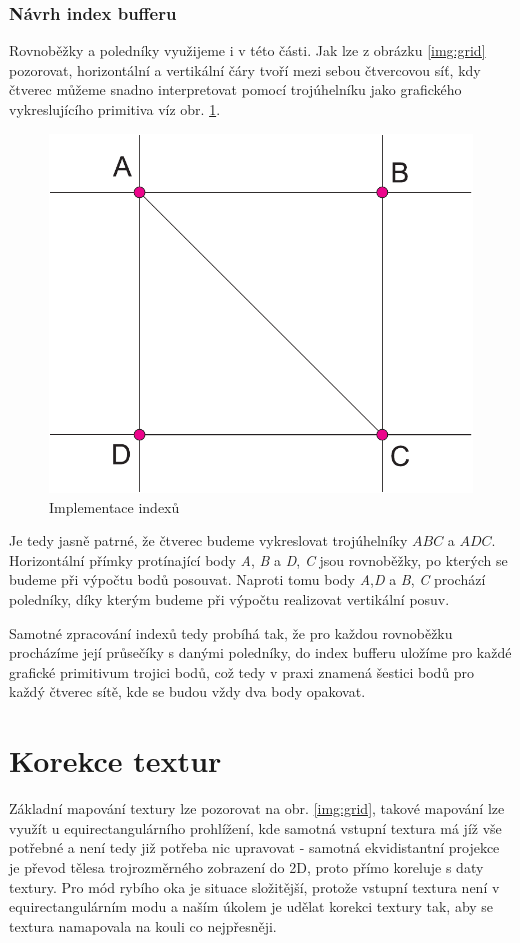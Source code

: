\subsubsection{Návrh index bufferu}
Rovnoběžky a poledníky využijeme i v této části. Jak lze z obrázku \ref{img:grid} pozorovat, horizontální a vertikální čáry tvoří mezi sebou čtvercovou síť, kdy čtverec můžeme snadno interpretovat pomocí trojúhelníku jako grafického vykreslujícího primitiva víz obr. \ref{img:indexes}.



\begin{figure}[h]
	\label{img:indexes}
	\centering
	\includegraphics[scale=1.0,angle=0,width=0.5\linewidth]{obrazky-figures/indexes}
	\caption{Implementace indexů}
\end{figure}

Je tedy jasně patrné, že čtverec budeme vykreslovat trojúhelníky $ABC$ a $ADC$. Horizontální přímky protínající body \textit{A}, \textit{B} a \textit{D}, \textit{C}   jsou rovnoběžky, po kterých se budeme při výpočtu bodů posouvat. Naproti tomu body \textit{A},\textit{D} a \textit{B}, \textit{C} prochází poledníky, díky kterým budeme při výpočtu realizovat vertikální posuv.

Samotné zpracování indexů tedy probíhá tak, že pro každou rovnoběžku procházíme její průsečíky s danými poledníky, do index bufferu uložíme pro každé grafické primitivum trojici bodů, což tedy v praxi znamená šestici bodů pro každý čtverec sítě, kde se budou vždy dva body opakovat.

\newpage

\section{Korekce textur}
Základní mapování textury lze pozorovat na obr. \ref{img:grid}, takové mapování lze využít u equirectangulárního prohlížení, kde samotná vstupní textura má jíž vše potřebné a není tedy již potřeba nic upravovat - samotná ekvidistantní projekce je převod tělesa trojrozměrného zobrazení do 2D, proto přímo koreluje s daty textury. Pro mód rybího oka je situace složitější, protože vstupní textura není v equirectangulárním modu a naším úkolem je udělat korekci textury tak, aby se textura namapovala na kouli co nejpřesněji.


